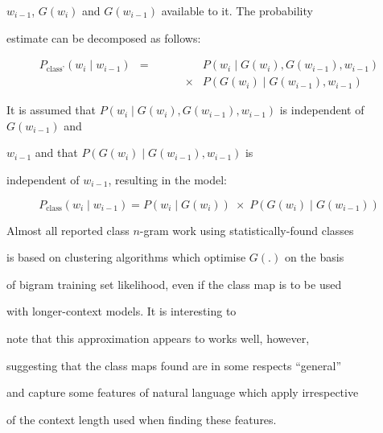 $w_{i-1}$, $G(w_i)$ and $G(w_{i-1})$ available to it. The probability


estimate can be decomposed as follows:


\begin{eqnarray}


P_{\textrm{class'}}(w_i \;|\; w_{i-1})


& = & P(w_i \;|\; G(w_i), G(w_{i-1}), w_{i-1} )\nonumber\\


  & \qquad\qquad\times & P(G(w_i) \;|\; G(w_{i-1}), w_{i-1})


\label{chap2equalToOne}


\end{eqnarray}





It is assumed that $P(w_i


\;|\; G(w_i), G(w_{i-1}), w_{i-1})$ is independent of $G(w_{i-1})$ and


$w_{i-1}$ and that $P(G(w_i) \;|\; G(w_{i-1}), w_{i-1})$ is


independent of $w_{i-1}$, resulting in the model:


\begin{equation}


P_{\textrm{class}}(w_i \;|\; w_{i-1}) = P(w_i \;|\; G(w_{i})) \;\times\;


P(G(w_i) \;|\; G(w_{i-1}))


\label{normclass}


\end{equation} 





Almost all reported class $n$-gram work using statistically-found classes


is based on clustering algorithms which optimise $G(.)$ on the basis


of bigram training set likelihood, even if the class map is to be used


with longer-context models.  It is interesting to


note that this approximation appears to works well, however,


suggesting that the class maps found are in some respects ``general''


and capture some features of natural language which apply irrespective


of the context length used when finding these features.








